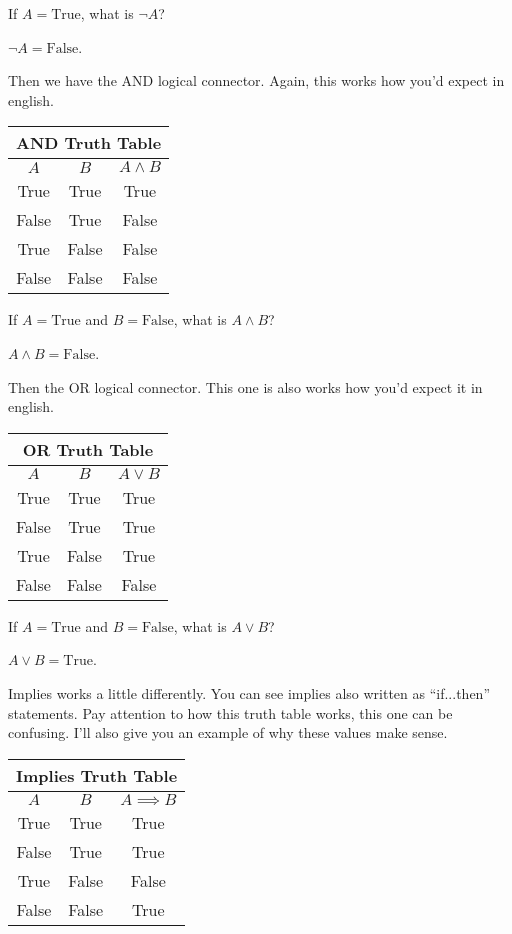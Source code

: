 \begin{boxexample}{}{}
	If $A=\text{True}$, what is $\neg A$?
	
	$\neg A=\text{False}$.
\end{boxexample}

Then we have the AND logical connector. Again, this works how you'd expect in english.

\medskip
\begin{tabular}{c|c|c}
	\hline
	\multicolumn{3}{c}{AND Truth Table}\\
	\hline
	$A$ & $B$ & $A \land B$\\
	\hline
	True & True & True\\
	False & True & False\\
	True & False & False\\
	False & False & False\\
	\hline
\end{tabular}
\medskip

\begin{boxexample}{}{}
	If $A=\text{True}$ and $B=\text{False}$, what is $A \land B$?
	
	$A \land B = \text{False}$.
\end{boxexample}

Then the OR logical connector. This one is also works how you'd expect it in english.

\medskip
\begin{tabular}{c|c|c}
	\hline
	\multicolumn{3}{c}{OR Truth Table}\\
	\hline
	$A$ & $B$ & $A \lor B$\\
	\hline
	True & True & True\\
	False & True & True\\
	True & False & True\\
	False & False & False\\
	\hline
\end{tabular}
\medskip

\begin{boxexample}{}{}
	If $A=\text{True}$ and $B=\text{False}$, what is $A \lor B$?
	
	$A \lor B = \text{True}$.
\end{boxexample}

Implies works a little differently. You can see implies also written as ``if...then'' statements. Pay attention to how this truth table works, this one can be confusing. I'll also give you an example of why these values make sense.

\medskip
\begin{tabular}{c|c|c}
	\hline
	\multicolumn{3}{c}{Implies Truth Table}\\
	\hline
	$A$ & $B$ & $A \implies B$\\
	\hline
	True & True & True\\
	False & True & True\\
	True & False & False\\
	False & False & True\\
	\hline
\end{tabular}
\medskip

